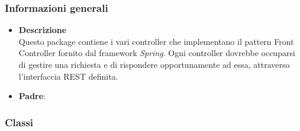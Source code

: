 \subsubsection{Informazioni generali}
\begin{itemize}
\item \textbf{Descrizione}\\
Questo package contiene i vari controller che implementano il pattern Front Controller fornito dal framework \emph{Spring}. Ogni controller dovrebbe occuparsi di gestire una richiesta e di rispondere opportunamente ad essa, attraverso l'interfaccia REST definita.
\item \textbf{Padre}: \hyperref[\nogloxy{swedesigner::server}]{}
\end{itemize}
\subsubsection{Classi}
\label{\nogloxy{swedesigner::server::controller::RequestHandlerController}}
\begin{figure}[h]
\centering
{}
\caption{}
\end{figure}
\FloatBarrier
